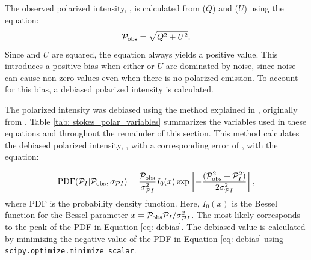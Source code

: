 
The observed polarized intensity, \POLIobsNS, is calculated from \SQ ($Q$) and \SU ($U$) using the equation: 
\begin{equation}
    \mathcal{P}_\text{obs} = \sqrt{Q^2 + U^2}.
    \label{eq: POLI}
\end{equation}
\noindent Since \SQ and $U$ are squared, the equation always yields a positive value. This introduces a positive bias when either \SQ or $U$ are dominated by noise, since noise can cause non-zero values even when there is no polarized emission. To account for this bias, a debiased polarized intensity is calculated. 



The polarized intensity was debiased using the method explained in \cite{sadavoy_dust_2019}, originally from \cite{HullDebias}. Table \ref{tab: stokes_polar_variables} summarizes the variables used in these equations and throughout the remainder of this section. This method calculates the debiased polarized intensity, \POLIns, with a corresponding error of \POLIerrNS, with the equation:

\begin{equation}
    \text{PDF}(\mathcal{P}_I|\mathcal{P}_\text{obs}, \sigma_{\mathcal{P}I})=\frac{\mathcal{P}_\text{obs}}{\sigma_{\mathcal{P}I}^2} I_0(x)\exp\left[-\frac{(\mathcal{P}_\text{obs}^2 + \mathcal{P}_I^2)}{2\sigma_{\mathcal{P}I}^2}{}\right],
    \label{eq: debias}
\end{equation}
\noindent where PDF is the probability density function. Here, $I_0(x)$ is the Bessel function for the Bessel parameter $x = \mathcal{P}_\text{obs} \mathcal{P}_I/\sigma_{\mathcal{P}I}^2$. The most likely \POLI corresponds to the peak of the PDF in Equation \ref{eq: debias}. The debiased value is calculated by minimizing the negative value of the PDF in Equation \ref{eq: debias} using \texttt{scipy.optimize.minimize\_scalar}. 



